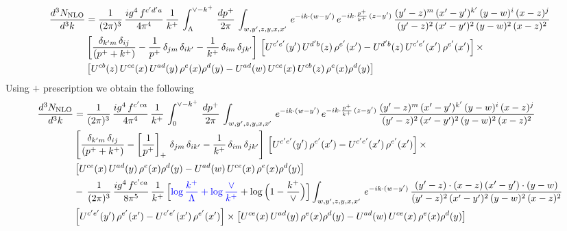 \documentclass[9pt]{article}
\numberwithin{equation}{section}
\begin{document}
\begin{align}
     \frac{d^{3}N_{\rm NLO}}{d^{3}k} & = \frac{1}{(2\pi)^{3}}\, \frac{ig^{4}\,f^{c'd'a}}{4\pi^{4}}\, \frac{1}{k^{+}}\,\int_{\Lambda}^{\vee-k^{+}}\, \frac{dp^{+}}{2\pi}\, \int_{w,y',z,y,x,x'}\, e^{-ik\cdot (w-y')}\, e^{-ik\cdot \frac{p^{+}}{k^{+}}\,(z-y')}\, \frac{(y'-z)^{m}\,(x'-y')^{k'}\,(y-w)^{i}\,(x-z)^{j}}{(y'-z)^{2}\,(x'-y')^{2}\,(y-w)^{2}\,(x-z)^{2}}\notag \\ & \left[\frac{\delta_{k'm}\,\delta_{ij}}{(p^{+}+k^{+})}-\frac{1}{p^{+}}\,\delta_{jm}\,\delta_{ik'}-\frac{1}{k^{+}}\, \delta_{im}\, \delta_{jk'}\right]\, \left[U^{c'e'}(y')\,U^{d'b}(z)\,\rho^{e'}(x')-U^{d'b}(z)\,U^{c'e'}(x')\,\rho^{e'}(x')\right]\times\notag \\ &  \left[U^{cb}(z)\,U^{ce}(x)\,U^{ad}(y)\,\rho^{e}(x)\rho^{d}(y)-U^{ad}(w)\,U^{ce}(x)\,U^{cb}(z)\,\rho^{e}(x)\rho^{d}(y)\right]
\end{align} 
Using $+$ prescription we obtain the following
\begin{align}
    \frac{d^{3}N_{\rm NLO}}{d^{3}k} & = \frac{1}{(2\pi)^{3}}\, \frac{ig^{4}\,f^{c'ca}}{4\pi^{4}}\, \frac{1}{k^{+}}\,\int_{0}^{\vee-k^{+}}\, \frac{dp^{+}}{2\pi}\, \int_{w,y',z,y,x,x'}\, e^{-ik\cdot (w-y')}\, e^{-ik\cdot \frac{p^{+}}{k^{+}}\,(z-y')}\, \frac{(y'-z)^{m}\,(x'-y')^{k'}\,(y-w)^{i}\,(x-z)^{j}}{(y'-z)^{2}\,(x'-y')^{2}\,(y-w)^{2}\,(x-z)^{2}}\notag \\ & \left[\frac{\delta_{k'm}\,\delta_{ij}}{(p^{+}+k^{+})}-\left[\frac{1}{p^{+}}\right]_{+}\,\delta_{jm}\,\delta_{ik'}-\frac{1}{k^{+}}\, \delta_{im}\, \delta_{jk'}\right]\, \left[U^{c'e'}(y')\,\rho^{e'}(x')-U^{c'e'}(x')\,\rho^{e'}(x')\right]\times \notag \\ &  \left[U^{ce}(x)\,U^{ad}(y)\,\rho^{e}(x)\rho^{d}(y)-U^{ad}(w)\,U^{ce}(x)\,\rho^{e}(x)\rho^{d}(y)\right]\notag \\ & -\,\frac{1}{(2\pi)^{3}}\, \frac{ig^{4}\,f^{c'ca}}{8\pi^{5}}\, \frac{1}{k^{+}}\,\Big[{\color{blue}\log\frac{k^{+}}{\Lambda}+\log\frac{\vee}{k^{+}}}+\log\Big(1-\frac{k^{+}}{\vee}\Big)\Big] \int_{w,y',z,y,x,x'}\, e^{-ik\cdot (w-y')}\, \frac{(y'-z)\cdot (x-z)\,(x'-y')\cdot (y-w)}{(y'-z)^{2}\,(x'-y')^{2}\,(y-w)^{2}\,(x-z)^{2}}\notag \\ & \left[U^{c'e'}(y')\,\rho^{e'}(x')-U^{c'e'}(x')\,\rho^{e'}(x')\right]\times  \left[U^{ce}(x)\,U^{ad}(y)\,\rho^{e}(x)\rho^{d}(y)-U^{ad}(w)\,U^{ce}(x)\,\rho^{e}(x)\rho^{d}(y)\right]
\end{align}
\end{document}
